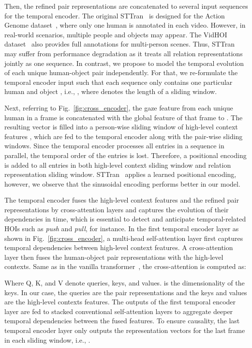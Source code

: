 \documentclass[times,twocolumn,final,authoryear]{elsarticle}
\begin{document}
Then, the refined pair representations are concatenated to several input sequences for the temporal encoder. The original STTran~\citep{hoi_v2:sttran} is designed for the Action Genome dataset~\citep{hoi_v_set:action_genome}, where only one human is annotated in each video. However, in real-world scenarios, multiple people and objects may appear. The VidHOI dataset~\citep{hoi_v_set:VidHOI} also provides full annotations for multi-person scenes. Thus, STTran may suffer from performance degradation as it treats all relation representations jointly as one sequence. In contrast, we propose to model the temporal evolution of each unique human-object pair independently. For that, we re-formulate the temporal encoder input such that each sequence only contains one particular human  and object , i.e., , where  denotes the length of a sliding window.

Next, referring to Fig.~\ref{fig:cross_encoder}, the gaze feature  from each unique human in a frame is concatenated with the global feature  of that frame to . The resulting vector is filled into a person-wise sliding window of high-level context features , which are fed to the temporal encoder along with the pair-wise sliding windows. Since the temporal encoder processes all entries in a sequence in parallel, the temporal order of the entries is lost. Therefore, a positional encoding is added to all entries in both high-level context sliding window and relation representation sliding window. STTran~\citep{hoi_v2:sttran} applies a learned positional encoding, however, we observe that the sinusoidal encoding performs better in our model.

The temporal encoder fuses the high-level context features and the refined pair representations by cross-attention layers and captures the evolution of their dependencies in time, which is essential to detect and anticipate temporal-related HOIs such as \emph{push} and \emph{pull}, for instance. In the first temporal encoder layer as shown in Fig.~\ref{fig:cross_encoder}, a multi-head self-attention layer first captures temporal dependencies between high-level context features. A cross-attention layer then fuses the human-object pair representations with the high-level contexts. Same as in the vanilla transformer~\citep{transformer:vanilla}, the cross-attention is computed as: 

Where Q, K, and V denote queries, keys, and values.  is the dimensionality of the keys. In our case, the queries are the pair representations and the keys and values are the high-level contexts features. The outputs of the first temporal encoder layer are fed to  stacked conventional self-attention layers to aggregate deeper temporal dependencies between the fused features. To ensure causality, the last temporal encoder layer only outputs the representation vectors for the last frame in each sliding window, i.e., .
\end{document}
